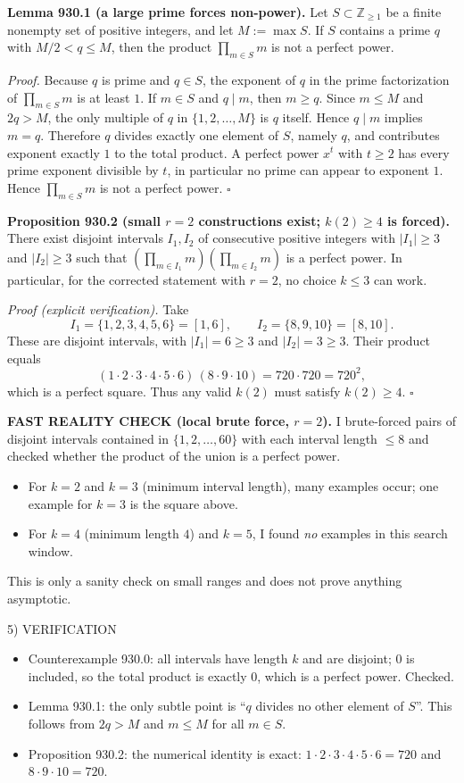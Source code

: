 \medskip
\textbf{Lemma 930.1 (a large prime forces non-power).}
Let $S\subset\mathbb Z_{\ge 1}$ be a finite nonempty set of positive integers, and let $M:=\max S$. If $S$ contains a prime $q$ with $M/2<q\le M$, then the product $\prod_{m\in S} m$ is not a perfect power.

\emph{Proof.}
Because $q$ is prime and $q\in S$, the exponent of $q$ in the prime factorization of $\prod_{m\in S} m$ is at least $1$.
If $m\in S$ and $q\mid m$, then $m\ge q$. Since $m\le M$ and $2q>M$, the only multiple of $q$ in $\{1,2,\dots,M\}$ is $q$ itself. Hence $q\mid m$ implies $m=q$.
Therefore $q$ divides exactly one element of $S$, namely $q$, and contributes exponent exactly $1$ to the total product.
A perfect power $x^t$ with $t\ge 2$ has every prime exponent divisible by $t$, in particular no prime can appear to exponent $1$. Hence $\prod_{m\in S} m$ is not a perfect power.
\hfill$\square$

\medskip
\textbf{Proposition 930.2 (small $r=2$ constructions exist; $k(2)\ge 4$ is forced).}
There exist disjoint intervals $I_1,I_2$ of consecutive positive integers with $|I_1|\ge 3$ and $|I_2|\ge 3$ such that
\((\prod_{m\in I_1}m)(\prod_{m\in I_2}m)\) is a perfect power.
In particular, for the corrected statement with $r=2$, no choice $k\le 3$ can work.

\emph{Proof (explicit verification).}
Take
\[
I_1=\{1,2,3,4,5,6\}=[1,6],\qquad I_2=\{8,9,10\}=[8,10].
\]
These are disjoint intervals, with $|I_1|=6\ge 3$ and $|I_2|=3\ge 3$. Their product equals
\[
(1\cdot2\cdot3\cdot4\cdot5\cdot6)\,(8\cdot9\cdot10)=720\cdot720=720^2,
\]
which is a perfect square.
Thus any valid $k(2)$ must satisfy $k(2)\ge 4$.
\hfill$\square$

\medskip
\textbf{FAST REALITY CHECK (local brute force, $r=2$).}
I brute-forced pairs of disjoint intervals contained in $\{1,2,\dots,60\}$ with each interval length $\le 8$ and checked whether the product of the union is a perfect power.
\begin{itemize}
\item For $k=2$ and $k=3$ (minimum interval length), many examples occur; one example for $k=3$ is the square above.
\item For $k=4$ (minimum length $4$) and $k=5$, I found \emph{no} examples in this search window.
\end{itemize}
This is only a sanity check on small ranges and does not prove anything asymptotic.

5) VERIFICATION

\begin{itemize}
\item Counterexample 930.0: all intervals have length $k$ and are disjoint; $0$ is included, so the total product is exactly $0$, which is a perfect power. Checked.
\item Lemma 930.1: the only subtle point is ``$q$ divides no other element of $S$''. This follows from $2q>M$ and $m\le M$ for all $m\in S$.
\item Proposition 930.2: the numerical identity is exact: $1\cdot2\cdot3\cdot4\cdot5\cdot6=720$ and $8\cdot9\cdot10=720$.
\end{itemize}

